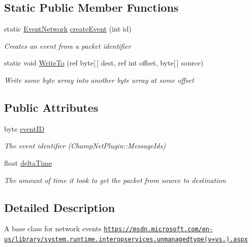 \subsection*{Static Public Member Functions}
\begin{DoxyCompactItemize}
\item 
static \hyperlink{class_event_network}{Event\-Network} \hyperlink{class_event_network_a9cf2940f859a4c2d168fbfe83e6a19e8}{create\-Event} (int id)
\begin{DoxyCompactList}\small\item\em Creates an event from a packet identifier \end{DoxyCompactList}\item 
static void \hyperlink{class_event_network_adf54898a5ba1d6efc5f24bd58cf84b8e}{Write\-To} (ref byte\mbox{[}$\,$\mbox{]} dest, ref int offset, byte\mbox{[}$\,$\mbox{]} source)
\begin{DoxyCompactList}\small\item\em Write some byte array into another byte array at some offset \end{DoxyCompactList}\end{DoxyCompactItemize}
\subsection*{Public Attributes}
\begin{DoxyCompactItemize}
\item 
byte \hyperlink{class_event_network_adff900346978771c10eddbe469755039}{event\-I\-D}
\begin{DoxyCompactList}\small\item\em The event identifier (Champ\-Net\-Plugin\-::\-Message\-Ids) \end{DoxyCompactList}\item 
float \hyperlink{class_event_network_a1417c775954bdd96b119af2d4707db9e}{delta\-Time}
\begin{DoxyCompactList}\small\item\em The amount of time it took to get the packet from source to destination \end{DoxyCompactList}\end{DoxyCompactItemize}


\subsection{Detailed Description}
A base class for network events \href{https://msdn.microsoft.com/en-us/library/system.runtime.interopservices.unmanagedtype(v=vs.110).aspx}{\tt https\-://msdn.\-microsoft.\-com/en-\/us/library/system.\-runtime.\-interopservices.\-unmanagedtype(v=vs.).\-aspx} 

